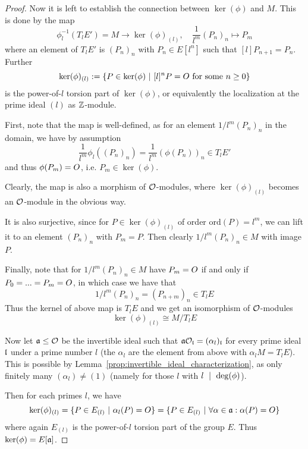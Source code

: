 \begin{proof}
    Now it is left to establish the connection between $\ker(\phi)$ and $M$.
    This is done by the map
    \begin{equation*}
        \phi_l^{-1}(T_lE') = M \to \ker(\phi)_{(l)}, \quad \frac 1 {l^m} (P_n)_n \mapsto P_m
    \end{equation*}
    where an element of $T_lE'$ is $(P_n)_n$ with $P_n \in E[l^n]$ such that $[l]P_{n + 1} = P_n$.
    Further
    \begin{equation*}
        \ker(\phi)_{(l)} := \{ P \in \ker(\phi) \ | \ \text{$[l]^nP = O$ for some $n \geq 0$}\}
    \end{equation*}
    is the power-of-$l$ torsion part of $\ker(\phi)$, or equivalently the localization at the prime ideal $(l)$ as $\mathbb{Z}$-module.

    First, note that the map is well-defined, as for an element $1/l^m (P_n)_n$ in the domain, we have by assumption
    \begin{equation*}
        \frac 1 {l^m} \phi_l((P_n)_n) = \frac 1 {l^m} (\phi(P_n))_n \in T_lE'
    \end{equation*}
    and thus $\phi(P_m) = O$, i.e. $P_m \in \ker(\phi)$.

    Clearly, the map is also a morphism of $\mathcal{O}$-modules, where $\ker(\phi)_{(l)}$ becomes an $\mathcal{O}$-module in the obvious way.
    
    It is also surjective, since for $P \in \ker(\phi)_{(l)}$ of order $\mathrm{ord}(P) = l^m$, we can lift it to an element $(P_n)_n$ with $P_m = P$.
    Then clearly $1/l^m(P_n)_n \in M$ with image $P$.

    Finally, note that for $1/l^m(P_n)_n \in M$ have $P_m = O$ if and only if $P_0 = ... = P_m = O$, in which case we have that
    \begin{equation*}
        1/l^m(P_n)_n = (P_{n + m})_n \in T_lE
    \end{equation*}
    Thus the kernel of above map is $T_lE$ and we get an isomorphism of $\mathcal{O}$-modules
    \begin{equation*}
        \ker(\phi)_{(l)} \cong M / T_lE
    \end{equation*}

    Now let $\mathfrak{a} \leq \mathcal{O}$ be the invertible ideal such that $\mathfrak{a}\mathcal{O}_{\mathfrak{l}} = (\alpha_l)_{\mathfrak{l}}$ for every prime ideal $\mathfrak{l}$ under a prime number $l$ (the $\alpha_l$ are the element from above with $\alpha_l M = T_lE$).
    This is possible by Lemma~\ref{prop:invertible_ideal_characterization}, as only finitely many $(\alpha_l) \neq (1)$ (namely for those $l$ with $l \ \mid \  \deg(\phi)$).

    Then for each primes $l$, we have
    \begin{equation*}
        \ker(\phi)_{(l)} = \{ P \in E_{(l)} \ | \ \alpha_l(P) = O \} = \{ P \in E_{(l)} \ | \ \forall \alpha \in \mathfrak{a}: \alpha(P) = O \}
    \end{equation*}
    where again $E_{(l)}$ is the power-of-$l$ torsion part of the group $E$.
    Thus $\ker(\phi) = E[\mathfrak{a}]$.
\end{proof}
